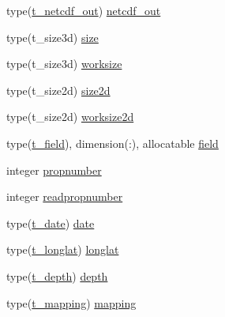 \begin{DoxyCompactItemize}
type(\mbox{\hyperlink{structmodulenetcdfcf__2__hdf5mohid_1_1t__netcdf__out}{t\+\_\+netcdf\+\_\+out}}) \mbox{\hyperlink{structmodulenetcdfcf__2__hdf5mohid_1_1t__netcdfcf__2__hdf5mohid_a9a30dcdbdc44636c088998f70839dd2a}{netcdf\+\_\+out}}
\item 
type(t\+\_\+size3d) \mbox{\hyperlink{structmodulenetcdfcf__2__hdf5mohid_1_1t__netcdfcf__2__hdf5mohid_a37656726478f37553bf3b8e17532a5de}{size}}
\item 
type(t\+\_\+size3d) \mbox{\hyperlink{structmodulenetcdfcf__2__hdf5mohid_1_1t__netcdfcf__2__hdf5mohid_abd4702135e754b7c58bc657d2462d787}{worksize}}
\item 
type(t\+\_\+size2d) \mbox{\hyperlink{structmodulenetcdfcf__2__hdf5mohid_1_1t__netcdfcf__2__hdf5mohid_a86e0b9154aecf43e767f50e13bc35332}{size2d}}
\item 
type(t\+\_\+size2d) \mbox{\hyperlink{structmodulenetcdfcf__2__hdf5mohid_1_1t__netcdfcf__2__hdf5mohid_a11c0ecf6833453d0d9127be7592ce0c0}{worksize2d}}
\item 
type(\mbox{\hyperlink{structmodulenetcdfcf__2__hdf5mohid_1_1t__field}{t\+\_\+field}}), dimension(\+:), allocatable \mbox{\hyperlink{structmodulenetcdfcf__2__hdf5mohid_1_1t__netcdfcf__2__hdf5mohid_a579cda304da1ac085e0880d84c58a161}{field}}
\item 
integer \mbox{\hyperlink{structmodulenetcdfcf__2__hdf5mohid_1_1t__netcdfcf__2__hdf5mohid_a9a17d0fc077b2e405fc07000ee763738}{propnumber}}
\item 
integer \mbox{\hyperlink{structmodulenetcdfcf__2__hdf5mohid_1_1t__netcdfcf__2__hdf5mohid_a181292ee953a4cbcdc4edf355f579d45}{readpropnumber}}
\item 
type(\mbox{\hyperlink{structmodulenetcdfcf__2__hdf5mohid_1_1t__date}{t\+\_\+date}}) \mbox{\hyperlink{structmodulenetcdfcf__2__hdf5mohid_1_1t__netcdfcf__2__hdf5mohid_a83efa8c1b4ade5a9207ef9106b1d410e}{date}}
\item 
type(\mbox{\hyperlink{structmodulenetcdfcf__2__hdf5mohid_1_1t__longlat}{t\+\_\+longlat}}) \mbox{\hyperlink{structmodulenetcdfcf__2__hdf5mohid_1_1t__netcdfcf__2__hdf5mohid_a0fa9c21e5c176ad23c85d839951fba5d}{longlat}}
\item 
type(\mbox{\hyperlink{structmodulenetcdfcf__2__hdf5mohid_1_1t__depth}{t\+\_\+depth}}) \mbox{\hyperlink{structmodulenetcdfcf__2__hdf5mohid_1_1t__netcdfcf__2__hdf5mohid_a7a73b591516dece0f12e7d60ac69f8df}{depth}}
\item 
type(\mbox{\hyperlink{structmodulenetcdfcf__2__hdf5mohid_1_1t__mapping}{t\+\_\+mapping}}) \mbox{\hyperlink{structmodulenetcdfcf__2__hdf5mohid_1_1t__netcdfcf__2__hdf5mohid_a4847c74d235a67ae0e927621bf1cb0fa}{mapping}}

\end{DoxyCompactItemize}
